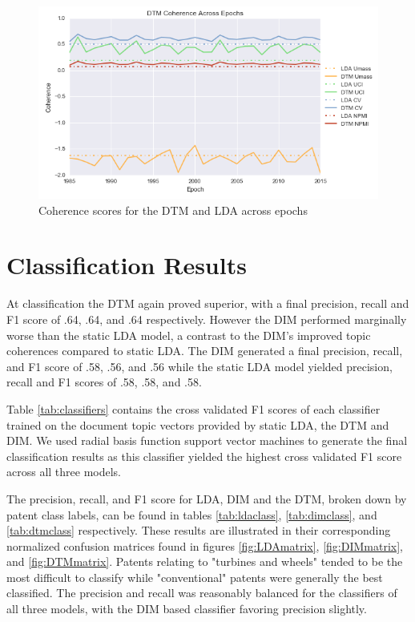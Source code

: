 \begin{figure}[!htb]
\centering
\includegraphics[width=130mm,scale=0.45]{Figures/DTMCoherences}
\decoRule
\caption[EpochCoherences]{Coherence scores for the DTM and LDA across epochs}
\label{fig:EpochCoherences}
\end{figure}


\section{Classification Results}
\label{classres}
At classification the DTM again proved superior, with a final precision, recall and F1 score of .64, .64, and .64 respectively. However the DIM performed marginally worse than the static LDA model, a contrast to the DIM's improved topic coherences compared to static LDA. The DIM generated a final precision, recall, and F1 score of .58, .56, and .56 while the static LDA model yielded precision, recall and F1 scores of .58, .58, and .58.

Table \ref{tab:classifiers} contains the cross validated F1 scores of each classifier trained on the document topic vectors provided by static LDA, the DTM and DIM. We used radial basis function support vector machines to generate the final classification results as this classifier yielded the highest cross validated F1 score across all three models.

The precision, recall, and F1 score for LDA, DIM and the DTM, broken down by patent class labels, can be found in tables \ref{tab:ldaclass}, \ref{tab:dimclass}, and \ref{tab:dtmclass} respectively. These results are illustrated in their corresponding normalized confusion matrices found in figures \ref{fig:LDAmatrix}, \ref{fig:DIMmatrix}, and \ref{fig:DTMmatrix}. Patents relating to "turbines and wheels" tended to be the most difficult to classify while "conventional" patents were generally the best classified. The precision and recall was reasonably balanced for the classifiers of all three models, with the DIM based classifier favoring precision slightly. 

